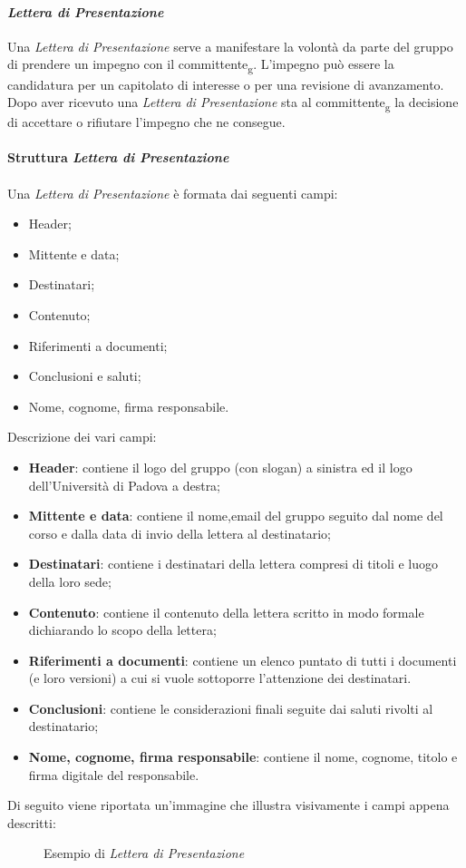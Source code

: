 \paragraph{\textit{Lettera di Presentazione}}
Una \textit{Lettera di Presentazione} serve a manifestare la volontà da parte del gruppo di prendere un impegno con il committente\textsubscript{g}.
L'impegno può essere la candidatura per un capitolato di interesse o per una revisione di avanzamento.
Dopo aver ricevuto una \textit{Lettera di Presentazione} sta al committente\textsubscript{g} la decisione di accettare o rifiutare l'impegno che ne consegue.
\\\\
\textbf{Struttura \textit{Lettera di Presentazione}}
\\\\
Una \textit{\textit{Lettera di Presentazione}} è formata dai seguenti campi:
\begin{itemize}
    \item Header;
    \item Mittente e data;
    \item Destinatari;
    \item Contenuto;
    \item Riferimenti a documenti;
    \item Conclusioni e saluti;
    \item Nome, cognome, firma responsabile.
\end{itemize}

\noindent Descrizione dei vari campi:
\begin{itemize}
\item \textbf{Header}: contiene il logo del gruppo (con slogan) a sinistra ed il logo dell'Università di Padova a destra;
\item \textbf{Mittente e data}: contiene il nome,email del gruppo seguito dal nome del corso e dalla data di invio della lettera al destinatario;
\item \textbf{Destinatari}: contiene i destinatari della lettera compresi di titoli e luogo della loro sede;
\item \textbf{Contenuto}: contiene il contenuto della lettera scritto in modo formale dichiarando lo scopo della lettera;
\item \textbf{Riferimenti a documenti}: contiene un elenco puntato di tutti i documenti (e loro versioni) a cui si vuole sottoporre l'attenzione dei destinatari. 
\item \textbf{Conclusioni}: contiene le considerazioni finali seguite dai saluti rivolti al destinatario;
\item \textbf{Nome, cognome, firma responsabile}: contiene il nome, cognome, titolo e firma digitale del responsabile.
\end{itemize}
Di seguito viene riportata un'immagine che illustra visivamente i campi appena descritti:
\begin{figure}[htbp]
    \centering
    \caption{Esempio di \textit{Lettera di Presentazione}}
\end{figure}
\pagebreak